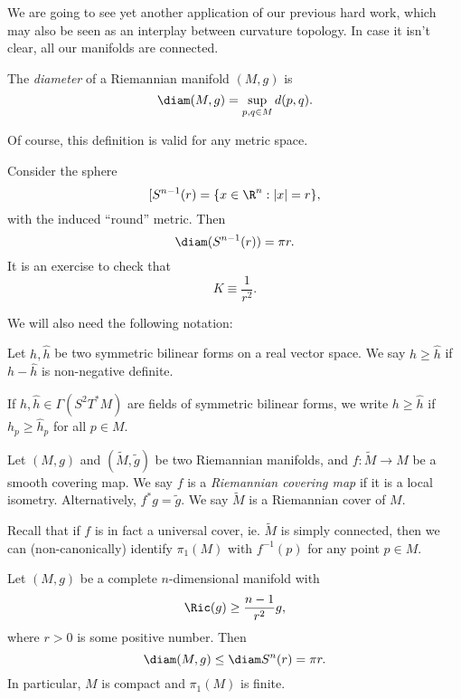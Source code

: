 \documentclass[a4paper]{article}
\begin{document}
We are going to see yet another application of our previous hard work, which may also be seen as an interplay between curvature topology. In case it isn't clear, all our manifolds are connected.

\begin{defi}[Diameter]
  The \emph{diameter} of a Riemannian manifold $(M, g)$ is
  \[
    \diam(M, g) = \sup_{p, q \in M} d(p, q).
  \]
\end{defi}
Of course, this definition is valid for any metric space.
\begin{eg}
  Consider the sphere
  \[[
    S^{n - 1}(r) = \{x \in \R^n: |x| = r\},
  \]
  with the induced ``round'' metric. Then
  \[
    \diam (S^{n - 1} (r)) = \pi r.
  \]
  It is an exercise to check that
  \[
    K \equiv \frac{1}{r^2}.
  \]
\end{eg}

We will also need the following notation:
\begin{notation}
  Let $h, \hat{h}$ be two symmetric bilinear forms on a real vector space. We say $h \geq \hat{h}$ if $h - \hat{h}$ is non-negative definite.

  If $h, \hat{h} \in \Gamma(S^2 T^* M)$ are fields of symmetric bilinear forms, we write $h \geq \hat{h}$ if $h_p \geq \hat{h}_p$ for all $p \in M$.
\end{notation}

\begin{defi}
  Let $(M, g)$ and $(\tilde{M}, \tilde{g})$ be two Riemannian manifolds, and $f: \tilde{M} \to M$ be a smooth covering map. We say $f$ is a \emph{Riemannian covering map} if it is a local isometry. Alternatively, $f^* g = \tilde{g}$. We say $\tilde{M}$ is a Riemannian cover of $M$.
\end{defi}

Recall that if $f$ is in fact a universal cover, ie. $\tilde{M}$ is simply connected, then we can (non-canonically) identify $\pi_1(M)$ with $f^{-1}(p)$ for any point $p \in M$.

\begin{defi}
  Let $(M, g)$ be a complete $n$-dimensional manifold with
  \[
    \Ric(g) \geq \frac{n - 1}{r^2} g,
  \]
  where $r > 0$ is some positive number. Then
  \[
    \diam(M, g) \leq \diam S^n(r) = \pi r.
  \]
  In particular, $M$ is compact and $\pi_1(M)$ is finite.
\end{defi}
\end{document}

